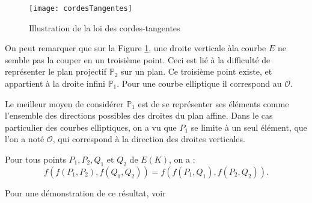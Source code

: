 \begin{figure}[h]
    \centering
    \texttt{[image: cordesTangentes]}
    \caption{Illustration de la loi des cordes-tangentes}
    \label{fig:cordesTangentes}
\end{figure}

On peut remarquer que sur la Figure \ref{fig:cordesTangentes}, une droite verticale
àla courbe $E$ ne semble
pas la couper en un troisième point. Ceci est lié à la difficulté de représenter le plan
projectif $\mathbb{P}_{2}$ sur un plan. Ce troisième point existe, et appartient à la droite infini
$\mathbb{P}_{1}$. Pour une courbe elliptique il correspond au $\mathcal{O}$.

\begin{remarque}
    Le meilleur moyen de considérer $\mathbb{P}_{1}$ est de se représenter ses éléments comme
    l'ensemble des directions possibles des droites du plan affine. Dans le cas particulier
    des courbes elliptiques, on a vu que $P_{1}$ se limite à un seul élément, que l'on a noté
    $\mathcal{O}$, qui correspond à la direction des droites verticales.
\end{remarque}

\begin{proposition}
    \label{prop:propasso}
    
    Pour tous points $P_1,P_2,Q_1$ et $Q_2$ de $E(K)$, on a :
    \[
    f(f(P_1,P_2),f(Q_1,Q_2)) = f(f(P_1,Q_1),f(P_2,Q_2))
    .\] 

    Pour une démonstration de ce résultat, voir 
\end{proposition}

